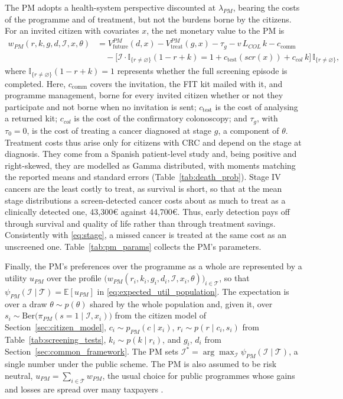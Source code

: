 \documentclass[12pt]{article}
\begin{document}
The PM adopts a health-system perspective discounted at $\lambda_{PM}$, bearing the costs of the programme and of treatment, but not the burdens borne by the citizens. For an invited citizen with covariates $x$, the net monetary value to the PM is
\begin{align}\label{eq:wpm}
w_{PM}(r,k,g,d,\mathcal{I},x,\theta) &= V^{PM}_{\text{future}}(d,x) - V^{PM}_{\text{treat}}(g,x) - \tau_g - v\,L_{COL}\,k
  - c_{\text{comm}} \nonumber \\
  & \quad - \big[\mathcal{I} \cdot \mathbb{I}_{\{r \neq \varnothing\}}(1 - r + k) = 1 + c_{\text{test}}(scr(x)) + c_{col}\,k \big]\,\mathbb{I}_{\{r\neq\varnothing\}},
\end{align}
where $\mathbb{I}_{\{r \neq \varnothing\}}(1 - r + k) = 1$ represents whether the full screening episode is completed. Here, $c_{\text{comm}}$ covers the invitation, the FIT kit mailed with it, and programme management, borne for every invited citizen whether or not they participate and not borne when no invitation is sent; $c_{\text{test}}$ is the cost of analysing a returned kit; $c_{col}$ is the cost of the confirmatory colonoscopy; and $\tau_g$, with $\tau_0 = 0$, is the cost of treating a cancer diagnosed at stage $g$, a component of $\theta$. Treatment costs thus arise only for citizens with CRC and depend on the stage at diagnosis. They come from a Spanish patient-level study \citep{corral2015estimation} and, being positive and right-skewed, they are modelled as Gamma distributed, with moments matching the reported means and standard errors \citep{briggs2006decision} (Table~\ref{tab:death_prob}). Stage IV cancers are the least costly to treat, as survival is short, so that at the mean stage distributions a screen-detected cancer costs about as much to treat as a clinically detected one, 43{,}300€ against 44{,}700€. Thus, early detection pays off through survival and quality of life rather than through treatment savings. Consistently with \eqref{eq:stage}, a missed cancer is treated at the same cost as an unscreened one. Table~\ref{tab:pm_params} collects the PM's parameters.

Finally, the PM's preferences over the programme as a whole are represented by a utility $u_{PM}$ over the profile $\big(w_{PM}(r_i,k_i,g_i,d_i,\mathcal{I},x_i,\theta)\big)_{i \in \mathcal{T}}$, so that $\psi_{PM}(\mathcal{I} \mid \mathcal{T}) = \mathbb{E}[u_{PM}]$ in \eqref{eq:expected_util_population}. The expectation is over a draw $\theta \sim p(\theta)$ shared by the whole population and, given it, over $s_i \sim \mathrm{Ber}\big(\pi_{PM}(s = 1 \mid \mathcal{I}, x_i)\big)$ from the citizen model of Section~\ref{sec:citizen_model}, $c_i \sim p_{PM}(c \mid x_i)$, $r_i \sim p(r \mid c_i, s_i)$ from Table~\ref{tab:screening_tests}, $k_i \sim p(k \mid r_i)$, and $g_i$, $d_i$ from Section~\ref{sec:common_framework}. The PM sets $\mathcal{I}^{*} = \arg\max_{\mathcal{I}} \psi_{PM}(\mathcal{I} \mid \mathcal{T})$, a single number under the public scheme. The PM is also assumed to be risk neutral, $u_{PM} = \sum_{i \in \mathcal{T}} w_{PM}$, the usual choice for public programmes whose gains and losses are spread over many taxpayers \citep{arrow1978uncertainty, baumstark2014relevance}.
\end{document}
